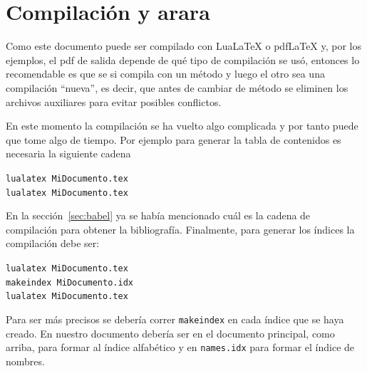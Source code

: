
\chapter{Compilación y arara}
Como este documento puede ser compilado con Lua\LaTeX{} o pdf\LaTeX{} y, por
los ejemplos, el pdf de salida depende de qué tipo de compilación se usó,
entonces lo recomendable es que se si compila con un método y luego el otro
sea una compilación ``nueva'', es decir, que antes de cambiar de método se
eliminen los archivos auxiliares para evitar posibles conflictos.

En este momento la compilación se ha vuelto algo complicada y por tanto puede
que tome algo de tiempo. Por ejemplo para generar la tabla de contenidos es
necesaria la siguiente cadena
\begin{flushleft}
  \verb|lualatex MiDocumento.tex|\\
  \verb|lualatex MiDocumento.tex|
\end{flushleft}

En la sección~\ref{sec:babel} ya se había mencionado cuál es la cadena de
compilación para obtener la bibliografía. Finalmente, para generar los
índices la compilación debe ser:
\begin{flushleft}
  \verb|lualatex MiDocumento.tex|\\
  \verb|makeindex MiDocumento.idx|\\
  \verb|lualatex MiDocumento.tex|
\end{flushleft}

Para ser más precisos se debería correr \texttt{makeindex} en cada índice que
se haya creado. En nuestro documento debería ser en el documento principal,
como arriba, para formar al índice alfabético y en \texttt{names.idx} para
formar el índice de nombres.

